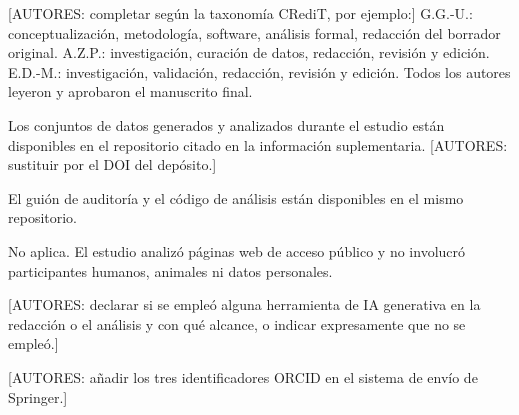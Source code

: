 \documentclass[pdflatex,sn-basic,Numbered]{sn-jnl}
\theoremstyle{thmstyleone}
\theoremstyle{thmstyletwo}
\theoremstyle{thmstylethree}
\begin{document}
\textcolor{gris}{[AUTORES: completar seg\'un la taxonom\'ia CRediT, por ejemplo:]} G.G.-U.: conceptualizaci\'on, metodolog\'ia, software, an\'alisis formal, redacci\'on del borrador original. A.Z.P.: investigaci\'on, curaci\'on de datos, redacci\'on, revisi\'on y edici\'on. E.D.-M.: investigaci\'on, validaci\'on, redacci\'on, revisi\'on y edici\'on. Todos los autores leyeron y aprobaron el manuscrito final.

Los conjuntos de datos generados y analizados durante el estudio est\'an disponibles en el repositorio citado en la informaci\'on suplementaria. \textcolor{gris}{[AUTORES: sustituir por el DOI del dep\'osito.]}

El gui\'on de auditor\'ia y el c\'odigo de an\'alisis est\'an disponibles en el mismo repositorio.

No aplica. El estudio analiz\'o p\'aginas web de acceso p\'ublico y no involucr\'o participantes humanos, animales ni datos personales.

\textcolor{gris}{[AUTORES: declarar si se emple\'o alguna herramienta de IA generativa en la redacci\'on o el an\'alisis y con qu\'e alcance, o indicar expresamente que no se emple\'o.]}

\textcolor{gris}{[AUTORES: a\~nadir los tres identificadores ORCID en el sistema de env\'io de Springer.]}
\end{document}
